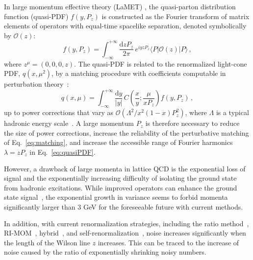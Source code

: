 \documentclass[aps,prl,groupedaddress,twocolumn,superscriptaddress,amsfonts,amssymb,amsmath,showpacs,floatfix,preprintnumbers]{revtex4-2}
\begin{document}
In large momentum effective theory (LaMET) \cite{Ji:2013dva, Ji:2014gla}, the quasi-parton distribution function (quasi-PDF) $f(y, P_z)$ is constructed as the Fourier transform of matrix elements of operators with equal-time spacelike separation, denoted symbolically by $\mathcal{O}(z)$:
\begin{equation}
f(y, P_z) = \int_{-\infty}^{+\infty} \frac{\mathrm{d}z P_z}{2\pi}\,e^{i y z P_z} \langle P | \mathcal{O}(z) | P \rangle\,, \label{eq:quasiPDF}
\end{equation}
where $z^\mu = (0, 0, 0, z)$. The quasi-PDF is related to the renormalized light-cone PDF, $q(x, \mu^2)$, by a matching procedure with coefficients computable in perturbation theory~\cite{Izubuchi:2018srq,Chen:2020ody,Li:2020xml}:
\begin{equation}
q(x, \mu) = \int_{-\infty}^{+\infty} \frac{\mathrm{d}y}{|y|}\,C\left(\frac{x}{y}; \frac{\mu}{x P_z}\right) f(y, P_z)\,, \label{eq:matching}
\end{equation}
up to power corrections that vary as $\mathcal{O}(\Lambda^2 / x^2 (1-x) P_z^2)$, where $\Lambda$ is a typical hadronic energy scale~\cite{Braun:2018brg,Zhang:2023bxs}. A large momentum $P_z$ is therefore 
necessary to reduce the size of power corrections, increase the reliability of the perturbative matching of Eq.~\eqref{eq:matching}, and increase the accessible range of Fourier harmonics $\lambda = z P_z$ in Eq.~\eqref{eq:quasiPDF}.

However, a drawback of large momenta in lattice QCD is the exponential loss of signal and the exponentially increasing difficulty of isolating the ground state from hadronic excitations. While improved operators can enhance the ground state signal~\cite{Bulava:2011yz,Aubin:2011zz,Bali:2016lva,Fischer:2020bgv,Wagman:2024rid,Hackett:2024xnx,Chakraborty:2024scw,Zhang:2025hyo}, the exponential growth in variance seems to forbid momenta significantly larger than 3 GeV for the foreseeable future with current methods. 

In addition, with current renormalization strategies, including the ratio method~\cite{Musch:2010ka,Orginos:2017kos}, RI-MOM~\cite{Alexandrou:2017huk,Zhang:2020rsx}, hybrid~\cite{Ji:2020brr}, and self-renormalization~\cite{LatticePartonLPC:2021gpi}, noise increases significantly when the length of the Wilson line $z$ increases. This can be traced to the increase of noise caused by the ratio of exponentially shrinking noisy numbers. 
\end{document}
